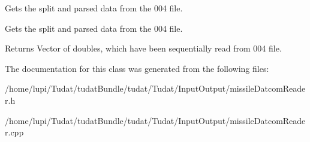Gets the split and parsed data from the 004 file. 

Gets the split and parsed data from the 004 file. \begin{DoxyReturn}{Returns}
Vector of doubles, which have been sequentially read from 004 file. 
\end{DoxyReturn}


The documentation for this class was generated from the following files\+:\begin{DoxyCompactItemize}
\item 
/home/lupi/\+Tudat/tudat\+Bundle/tudat/\+Tudat/\+Input\+Output/missile\+Datcom\+Reader.\+h\item 
/home/lupi/\+Tudat/tudat\+Bundle/tudat/\+Tudat/\+Input\+Output/missile\+Datcom\+Reader.\+cpp\end{DoxyCompactItemize}

